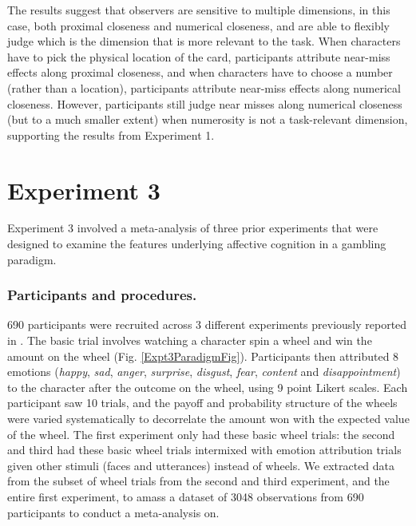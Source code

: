 \documentclass[10pt,letterpaper]{article}
\begin{document}
The results suggest that observers are sensitive to multiple dimensions, in this case, both proximal closeness and numerical closeness, and are able to flexibly judge which is the dimension that is more relevant to the task. When characters have to pick the physical location of the card, participants attribute near-miss effects along proximal closeness, and when characters have to choose a number (rather than a location), participants attribute near-miss effects along numerical closeness. However, participants still judge near misses along numerical closeness (but to a much smaller extent) when numerosity is not a task-relevant dimension, supporting the results from Experiment 1. 


\section{Experiment 3}
	Experiment 3 involved a meta-analysis of three prior experiments that were designed to examine the features underlying affective cognition in a gambling paradigm. 
	
\subsubsection{Participants and procedures.}
	690 participants were recruited across 3 different experiments previously reported in . The basic trial involves watching a character spin a wheel and win the amount on the wheel (Fig. \ref{Expt3ParadigmFig}). Participants then attributed 8 emotions (\textit{happy}, \textit{sad}, \textit{anger}, \textit{surprise}, \textit{disgust}, \textit{fear}, \textit{content} and \textit{disappointment}) to the character after the outcome on the wheel, using 9 point Likert scales. Each participant saw 10 trials, and the payoff and probability structure of the wheels were varied systematically to decorrelate the amount won with the expected value of the wheel. The first experiment only had these basic wheel trials: the second and third had these basic wheel trials intermixed with emotion attribution trials given other stimuli (faces and utterances) instead of wheels. We extracted data from the subset of wheel trials from the second and third experiment, and the entire first experiment, to amass a dataset of 3048 observations from 690 participants to conduct a meta-analysis on.
	
\end{document}
